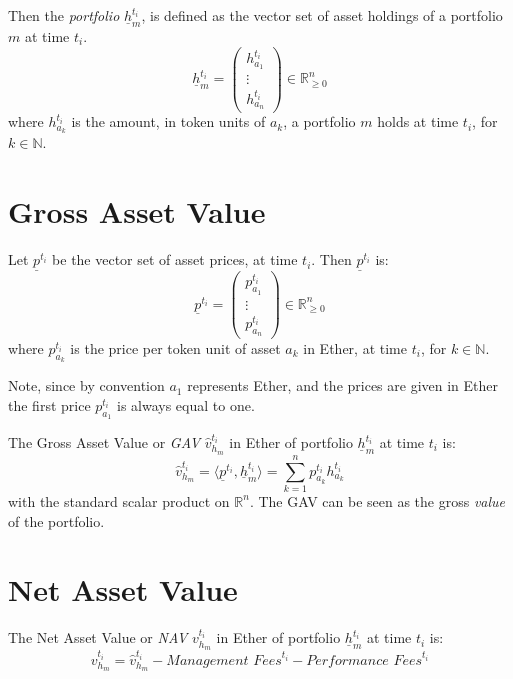 \documentclass[9pt,oneside]{amsart}
\theoremstyle{plain}
\begin{document}
Then the \textit{portfolio} $\underline{h}_m^{t_i}$, is defined as the vector set of asset holdings of a portfolio $m$ at time $t_i$.
\begin{equation}
	\underline{h}_m^{t_i} = \begin{pmatrix}h_{a_{1}}^{t_i}\\ \vdots \\ h_{a_{n}}^{t_i}\end{pmatrix} \in \mathbb{R}_{\geq 0}^n
\end{equation}
where $h_{a_{k}}^{t_i}$ is the amount, in token units of $a_k$, a portfolio $m$ holds at time $t_i$, for $k \in \mathbb{N}$.

\section{Gross Asset Value}\label{app:defgav}

Let $\underline{p}^{t_i}$ be the vector set of asset prices, at time $t_i$. Then $\underline{p}^{t_i}$ is:
\begin{equation}
	\underline{p}^{t_i} = \begin{pmatrix}p_{a_{1}}^{t_i}\\ \vdots \\ p_{a_{n}}^{t_i}\end{pmatrix} \in \mathbb{R}_{\geq 0}^n
\end{equation}
where $p_{a_{k}}^{t_i}$ is the price per token unit of asset $a_k$ in Ether, at time $t_i$, for $k \in \mathbb{N}$.

Note, since by convention $a_1$ represents Ether, and the prices are given in Ether the first price $p_{a_{1}}^{t_i}$ is always equal to one.

The Gross Asset Value or \textit{GAV} $\hat{v}_{h_m}^{t_i}$ in Ether of portfolio $\underline{h}_m^{t_i}$ at time $t_i$ is:
\begin{equation}
	\hat{v}_{h_m}^{t_i} = \langle \underline{p}^{t_i}, \underline{h}_m^{t_i}\rangle = \sum_{k=1}^{n} p_{a_{k}}^{t_i}h_{a_{k}}^{t_i}
\end{equation}
with the standard scalar product on $\mathbb{R}^n$. The GAV can be seen as the gross \textit{value} of the portfolio.

\section{Net Asset Value}\label{app:defnav}

The Net Asset Value or \textit{NAV} $v_{h_m}^{t_i}$ in Ether of portfolio $\underline{h}_m^{t_i}$ at time $t_i$ is:
\begin{equation}
v_{h_m}^{t_i} = \hat{v}_{h_m}^{t_i} - \textit{Management Fees}^{t_i} - \textit{Performance Fees}^{t_i}
\end{equation}
\end{document}
